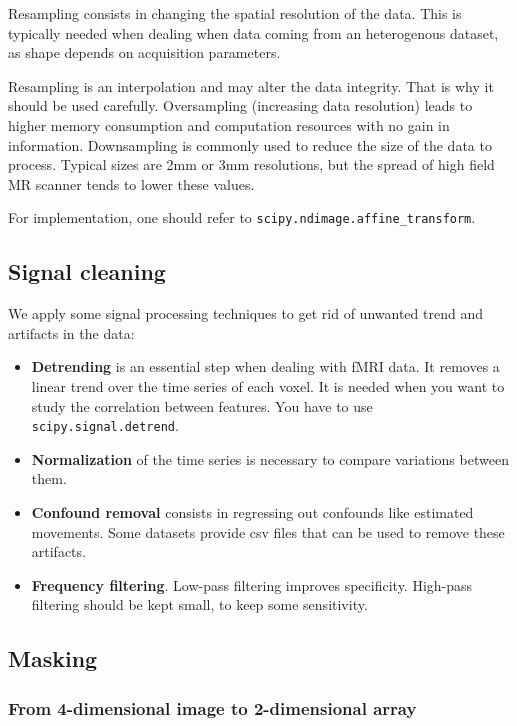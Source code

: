 \documentclass{frontiersSCNS} %
\begin{document}
Resampling consists in changing the spatial resolution of the data. This is
typically needed
when dealing when data coming from an heterogenous dataset, as shape depends
on acquisition parameters.

Resampling is an interpolation and may alter the data integrity. That is
why it should be used carefully. Oversampling (increasing
data resolution) leads to higher memory consumption and computation resources
with no gain in information.
Downsampling is commonly used to reduce the size of the data to process.
Typical sizes are 2mm or 3mm resolutions, but the spread of high field MR
scanner tends to lower these values.

For implementation, one should refer to \texttt{scipy.ndimage.affine\_transform}.

\subsection{Signal cleaning}

We apply some signal processing techniques to get rid of unwanted trend and
artifacts in the data:

\begin{itemize}
    \item{\bf Detrending} is an essential step when dealing with fMRI data. It removes a
linear trend over the time series of each
voxel. It is needed when you want to study the correlation between
features. You have to use \texttt{scipy.signal.detrend}.\\
\item{\bf Normalization} of the time series is necessary to compare variations
between them.\\
\item{\bf Confound removal} consists in regressing out confounds like
estimated movements. Some datasets provide csv files that can be used to remove
these artifacts.\\
\item{\bf Frequency filtering}. Low-pass filtering improves specificity.
High-pass filtering should be kept small, to keep some sensitivity.
\end{itemize}

\subsection{Masking}

\subsubsection{From 4-dimensional image to 2-dimensional array}
\end{document}
